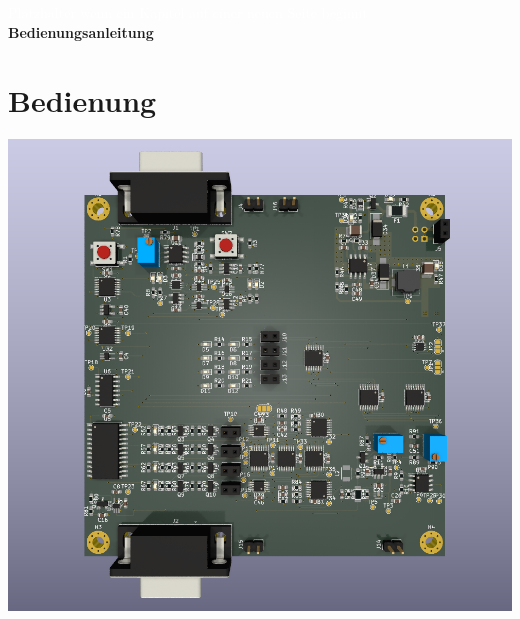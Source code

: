 \documentclass[a4paper,11pt]{scrartcl}
\begin{document}
\begin{center}
	\begin{huge}
	\textcolor{white}{\tiny{Platzhalter wenn ein Kapitel auf einer neuen Seite beginnt\\}}
	\textbf{Bedienungsanleitung}
	\end{huge}
\end{center}

\section{Bedienung}

\begin{center}
\includegraphics[width=15cm]{Bilder/Kabeltester-superbild.png}
\end{center}
\end{document}
